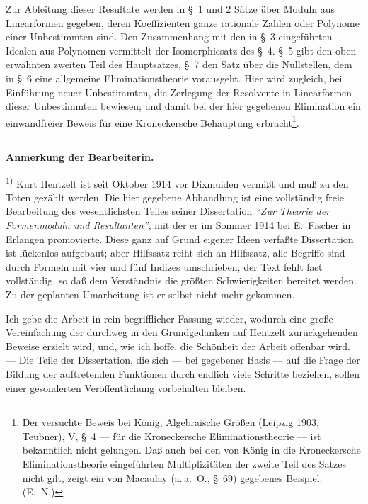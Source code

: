 \documentclass[fontsize=10pt,paper=a5,pagesize,headings=small]{scrbook}
\theoremstyle{plain}
\begin{document}
Zur Ableitung dieser Resultate werden in \S~1 und 2 Sätze über Moduln aus
Linearformen gegeben, deren Koeffizienten ganze rationale Zahlen oder Polynome einer
Unbestimmten sind. Den Zusammenhang mit den in \S~3 eingeführten Idealen aus
Polynomen vermittelt der Isomorphiesatz des \S~4. \S~5 gibt den oben erwähnten zweiten
Teil des Hauptsatzes, \S~7 den Satz über die Nullstellen, dem in \S~6 eine allgemeine
Eliminationstheorie vorausgeht. Hier wird zugleich, bei Einführung neuer Unbestimmten,
die Zerlegung der Resolvente in Linearformen dieser Unbestimmten bewiesen; und damit
bei der hier gegebenen Elimination ein einwandfreier Beweis für eine Kroneckersche
Behauptung erbracht\footnote{Der versuchte Beweis bei König, Algebraische Größen
(Leipzig 1903, Teubner), V, \S~4 --- für die Kroneckersche Eliminationstheorie --- ist
bekanntlich nicht gelungen. Daß auch bei den von König in die Kroneckersche Eliminations\-theorie
eingeführten Multiplizitäten der zweite Teil des Satzes nicht gilt, zeigt ein von
Macaulay (a.\,a.~O., \S~69) gegebenes Beispiel. (E.~N.)}.

\vspace{6pt}
\noindent\rule{\textwidth}{0.4pt}
\vspace{4pt}

\noindent\textbf{Anmerkung der Bearbeiterin.}

\noindent\textsuperscript{1)} Kurt Hentzelt ist seit Oktober 1914 vor Dixmuiden vermißt und muß zu den Toten
gezählt werden. Die hier gegebene Abhandlung ist eine vollständig freie Bearbeitung des
wesentlichsten Teiles seiner Dissertation \textit{``Zur Theorie der Formenmoduln und
Resultanten''}, mit der er im Sommer 1914 bei E.~Fischer in Erlangen promovierte. Diese
ganz auf Grund eigener Ideen verfaßte Dissertation ist lückenlos aufgebaut; aber Hilfssatz
reiht sich an Hilfssatz, alle Begriffe sind durch Formeln mit vier und fünf Indizes
umschrieben, der Text fehlt fast vollständig, so daß dem Verständnis die größten
Schwierigkeiten bereitet werden. Zu der geplanten Umarbeitung ist er selbst nicht mehr
gekommen.

Ich gebe die Arbeit in rein begrifflicher Fassung wieder, wodurch eine große
Vereinfachung der durchweg in den Grundgedanken auf Hentzelt zurückgehenden Beweise
erzielt wird, und, wie ich hoffe, die Schönheit der Arbeit offenbar wird. --- Die Teile
der Dissertation, die sich --- bei gegebener Basis --- auf die Frage der Bildung der
auftretenden Funktionen durch endlich viele Schritte beziehen, sollen einer gesonderten
Veröffentlichung vorbehalten bleiben.
\end{document}
